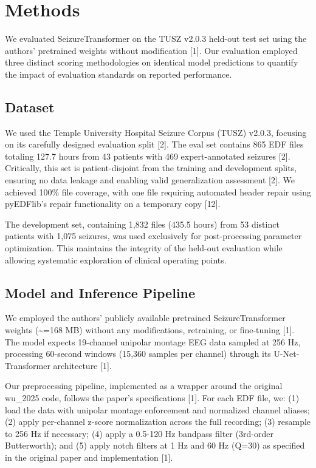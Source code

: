 \documentclass[
]{article}
\begin{document}
\hypertarget{methods}{%
\section{Methods}\label{methods}}

We evaluated SeizureTransformer on the TUSZ v2.0.3 held-out test set
using the authors' pretrained weights without modification {[}1{]}. Our
evaluation employed three distinct scoring methodologies on identical
model predictions to quantify the impact of evaluation standards on
reported performance.

\hypertarget{dataset}{%
\subsection{Dataset}\label{dataset}}

We used the Temple University Hospital Seizure Corpus (TUSZ) v2.0.3,
focusing on its carefully designed evaluation split {[}2{]}. The eval
set contains 865 EDF files totaling 127.7 hours from 43 patients with
469 expert-annotated seizures {[}2{]}. Critically, this set is
patient-disjoint from the training and development splits, ensuring no
data leakage and enabling valid generalization assessment {[}2{]}. We
achieved 100\% file coverage, with one file requiring automated header
repair using pyEDFlib's repair functionality on a temporary copy
{[}12{]}.

The development set, containing 1,832 files (435.5 hours) from 53
distinct patients with 1,075 seizures, was used exclusively for
post-processing parameter optimization. This maintains the integrity of
the held-out evaluation while allowing systematic exploration of
clinical operating points.

\hypertarget{model-and-inference-pipeline}{%
\subsection{Model and Inference
Pipeline}\label{model-and-inference-pipeline}}

We employed the authors' publicly available pretrained
SeizureTransformer weights (\textasciitilde=168 MB) without any
modifications, retraining, or fine-tuning {[}1{]}. The model expects
19-channel unipolar montage EEG data sampled at 256 Hz, processing
60-second windows (15,360 samples per channel) through its
U-Net-Transformer architecture {[}1{]}.

Our preprocessing pipeline, implemented as a wrapper around the original
wu\_2025 code, follows the paper's specifications {[}1{]}. For each EDF
file, we: (1) load the data with unipolar montage enforcement and
normalized channel aliases; (2) apply per-channel z-score normalization
across the full recording; (3) resample to 256 Hz if necessary; (4)
apply a 0.5-120 Hz bandpass filter (3rd-order Butterworth); and (5)
apply notch filters at 1 Hz and 60 Hz (Q=30) as specified in the
original paper and implementation {[}1{]}.
\end{document}
